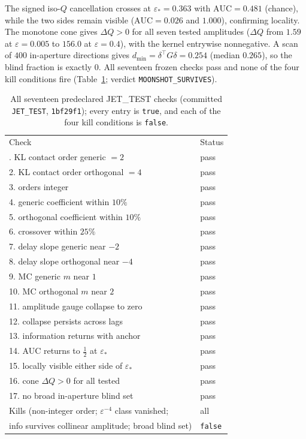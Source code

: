 \documentclass[aps,prl,onecolumn,notitlepage,nofootinbib,superscriptaddress]{revtex4-2}
\newcommand{\eps}{\varepsilon}
\begin{document}
The signed iso-$Q$ cancellation crosses at $\eps_\ast=0.363$ with
$\mathrm{AUC}=0.481$ (chance), while the two sides remain visible
($\mathrm{AUC}=0.026$ and $1.000$), confirming locality. The monotone cone gives
$\Delta Q>0$ for all seven tested amplitudes ($\Delta Q$ from $1.59$ at
$\eps=0.005$ to $156.0$ at $\eps=0.4$), with the kernel entrywise nonnegative. A
scan of $400$ in-aperture directions gives $d_{\min}=\delta^{\!\top}G\delta=0.254$
(median $0.265$), so the blind fraction is exactly $0$. All seventeen frozen
checks pass and none of the four kill conditions fire (Table~\ref{tab:checks};
verdict \texttt{MOONSHOT\_SURVIVES}).

\begin{table}[h]
\centering
\caption{All seventeen predeclared JET\_TEST checks (committed
\texttt{JET\_TEST}, \texttt{1bf29f1}); every entry is \texttt{true}, and each of
the four kill conditions is \texttt{false}.}
\label{tab:checks}
\begin{ruledtabular}
\begin{tabular}{ll}
Check & Status\\
\colrule
1. KL contact order generic $=2$ & pass\\
2. KL contact order orthogonal $=4$ & pass\\
3. orders integer & pass\\
4. generic coefficient within $10\%$ & pass\\
5. orthogonal coefficient within $10\%$ & pass\\
6. crossover within $25\%$ & pass\\
7. delay slope generic near $-2$ & pass\\
8. delay slope orthogonal near $-4$ & pass\\
9. MC generic $m$ near $1$ & pass\\
10. MC orthogonal $m$ near $2$ & pass\\
11. amplitude gauge collapse to zero & pass\\
12. collapse persists across lags & pass\\
13. information returns with anchor & pass\\
14. AUC returns to $\tfrac12$ at $\eps_\ast$ & pass\\
15. locally visible either side of $\eps_\ast$ & pass\\
16. cone $\Delta Q>0$ for all tested & pass\\
17. no broad in-aperture blind set & pass\\
\colrule
Kills (non-integer order; $\eps^{-4}$ class vanished; & all\\
info survives collinear amplitude; broad blind set) & \texttt{false}\\
\end{tabular}
\end{ruledtabular}
\end{table}
\end{document}
